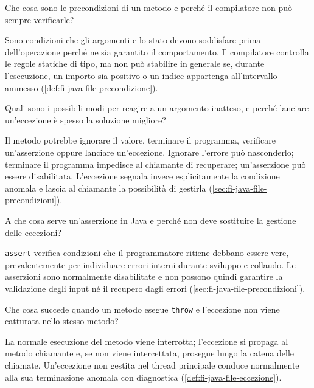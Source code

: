 \begin{exercise}
\label{ex:fi-esercizi-java-file-precondizioni}
Che cosa sono le precondizioni di un metodo e perché il
compilatore non può sempre verificarle?
\end{exercise}

Sono condizioni che gli argomenti e lo stato devono soddisfare
prima dell'operazione perché ne sia garantito il comportamento.
Il compilatore controlla le regole statiche di tipo, ma non
può stabilire in generale se, durante l'esecuzione, un importo
sia positivo o un indice appartenga all'intervallo ammesso
(\cref{def:fi-java-file-precondizione}).

\begin{exercise}
\label{ex:fi-esercizi-java-file-argomenti-inattesi}
Quali sono i possibili modi per reagire a un argomento inatteso,
e perché lanciare un'eccezione è spesso la soluzione migliore?
\end{exercise}

Il metodo potrebbe ignorare il valore, terminare il programma,
verificare un'asserzione oppure lanciare un'eccezione. Ignorare
l'errore può nasconderlo; terminare il programma impedisce al
chiamante di recuperare; un'asserzione può essere disabilitata.
L'eccezione segnala invece esplicitamente la condizione anomala
e lascia al chiamante la possibilità di gestirla
(\cref{sec:fi-java-file-precondizioni}).

\begin{exercise}
\label{ex:fi-esercizi-java-file-assert}
A che cosa serve un'asserzione in Java e perché non deve
sostituire la gestione delle eccezioni?
\end{exercise}

\texttt{assert} verifica condizioni che il programmatore ritiene
debbano essere vere, prevalentemente per individuare errori
interni durante sviluppo e collaudo. Le asserzioni sono normalmente
disabilitate e non possono quindi garantire la validazione degli
input né il recupero dagli errori
(\cref{sec:fi-java-file-precondizioni}).

\begin{exercise}
\label{ex:fi-esercizi-java-file-throw-propagazione}
Che cosa succede quando un metodo esegue \texttt{throw} e
l'eccezione non viene catturata nello stesso metodo?
\end{exercise}

La normale esecuzione del metodo viene interrotta; l'eccezione
si propaga al metodo chiamante e, se non viene intercettata,
prosegue lungo la catena delle chiamate. Un'eccezione non gestita
nel thread principale conduce normalmente alla sua terminazione
anomala con diagnostica
(\cref{def:fi-java-file-eccezione}).

